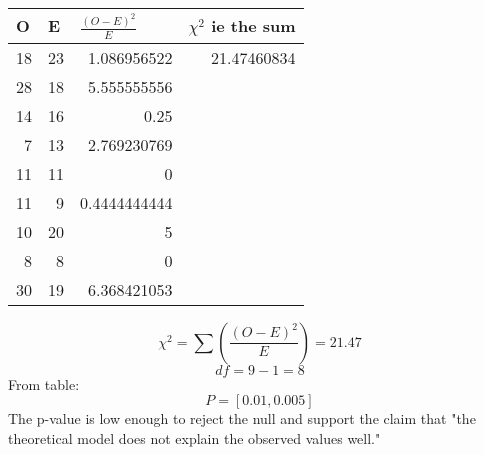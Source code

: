 \documentclass[11pt]{article}
\begin{document}
\begin{enumerate}
        \begin{table}[h]
          \begin{tabular}{|r|r|r|l}
          \hline
          \multicolumn{1}{|l|}{\textbf{O}} & \multicolumn{1}{l|}{\textbf{E}} & \multicolumn{1}{l|}{$\frac{(O-E)^2}{E}$} & \multicolumn{1}{l|}{$\chi^2$ ie the sum} \\ \hline
          18                               & 23                              & 1.086956522                                                  & \multicolumn{1}{r|}{21.47460834}                        \\ \hline
          28                               & 18                              & 5.555555556                                                  &                                                                  \\ \cline{1-3}
          14                               & 16                              & 0.25                                                         &                                                                  \\ \cline{1-3}
          7                                & 13                              & 2.769230769                                                  &                                                                  \\ \cline{1-3}
          11                               & 11                              & 0                                                            &                                                                  \\ \cline{1-3}
          11                               & 9                               & 0.4444444444                                                 &                                                                  \\ \cline{1-3}
          10                               & 20                              & 5                                                            &                                                                  \\ \cline{1-3}
          8                                & 8                               & 0                                                            &                                                                  \\ \cline{1-3}
          30                               & 19                              & 6.368421053                                                  &                                                                  \\ \cline{1-3}
          \end{tabular}
          \end{table}

        $$\chi^2 = \sum(\frac{(O-E)^2}{E}) = 21.47$$
        $$df = 9-1=8$$
        From table:
        $$P = [0.01, 0.005]$$
        The p-value is low enough to reject the null and support the claim that "the theoretical model does not explain the observed values well."
\end{enumerate}
\end{document}
